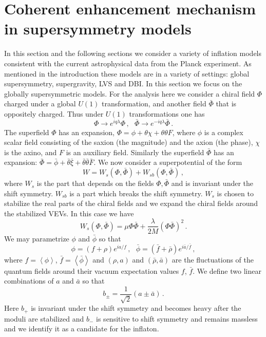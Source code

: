 \documentclass[12pt]{article}
\begin{document}
\section{Coherent enhancement mechanism in supersymmetry models \label{sec:Supersymmetry}}
In this section and the following sections we consider a variety of inflation models consistent with the current astrophysical data from the Planck experiment.
As mentioned in the introduction these models are in a variety of settings: global supersymmetry, supergravity, LVS and DBI.
In this section we focus on the globally supersymmetric models.
For the analysis here we consider a chiral field $\Phi$ charged under a global $U\left(1\right)$ transformation, and another field $\bar\Phi$ that is oppositely charged.
Thus under $U\left(1\right)$ transformations one has
\begin{equation}
  \Phi \to e^{i q \lambda} \Phi\,,
  ~~~ \bar\Phi \to e^{-i q \lambda} \bar\Phi\,.
\end{equation}
The superfield $\Phi$ has an expansion, $\Phi = \phi + \theta \chi + \theta \theta F$, where $\phi$ is a complex scalar field consisting of the saxion (the magnitude) and the axion (the phase), $\chi$ is the axino, and $F$ is an auxiliary field.
Similarly the superfield $\bar\Phi$ has an expansion: $\bar\Phi = \bar\phi + \bar\theta \bar\xi + \bar\theta \bar\theta \bar F$.
We now consider a superpotential of the form
\begin{equation} \label{eq:supersymmetry:W}
  W = W_s\left(\Phi, \bar\Phi\right) + W_{sb}\left(\Phi, \bar\Phi\right)\,,
\end{equation}
where $W_s$ is the part that depends on the fields $\Phi, \bar\Phi$ and is invariant under the shift symmetry.
$W_{sb}$ is a part which breaks the shift symmetry.
$W_s$ is chosen to stabilize the real parts of the chiral fields and we expand the chiral fields around the stabilized VEVs.
In this case we have
\begin{equation}
  W_s\left(\Phi, \bar\Phi\right) =
    \mu \Phi \bar\Phi + \frac{\lambda}{2 M} \left(\Phi \bar\Phi\right)^2\,.
\end{equation}
We may parametrize $\phi$ and $\bar\phi$ so that
\begin{equation}
  \phi = \left(f + \rho\right) e^{i a / f}\,,
  ~~~ \bar\phi = \left(\bar f + \bar\rho\right) e^{i \bar a / \bar f}\,,
\end{equation}
where $f = \left<\phi\right>$, $\bar f = \left<\bar\phi\right>$ and $\left(\rho, a\right)$ and $\left(\bar\rho, \bar a\right)$ are the fluctuations of the quantum fields around their vacuum expectation values $f$, $\bar f$.
We define two linear combinations of $a$ and $\bar a$ so that
\begin{equation} \label{eq:b+-}
  b_{\pm}= \frac{1}{\sqrt 2} \left(a \pm \bar a\right)\,.
\end{equation}
Here $b_+$ is invariant under the shift symmetry and becomes heavy after the moduli are stabilized and $b_-$ is sensitive to shift symmetry and remains massless and we identify it as a candidate for the inflaton.
\end{document}
